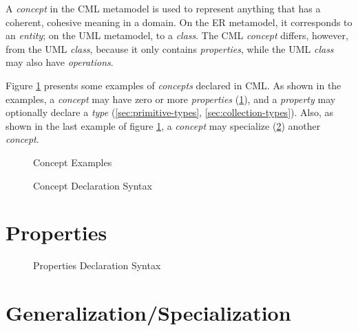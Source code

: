 A \emph{concept} in the CML metamodel is used to represent anything
that has a coherent, cohesive meaning in a domain.
On the ER \cite{er} metamodel,
it corresponds to an \emph{entity};
on the UML \cite{uml} metamodel,
to a \emph{class}.
The CML \emph{concept} differs, however, from the UML \emph{class},
because it only contains \emph{properties},
while the UML \emph{class} may also have \emph{operations}.

Figure \ref{fig:ex:concepts} presents some examples of \emph{concepts} declared in CML.
As shown in the examples,
a \emph{concept} may have zero or more \emph{properties}
(\ref{sec:properties}),
and a \emph{property} may optionally declare a \emph{type}
(\ref{sec:primitive-types}, \ref{sec:collection-types}).
Also, as shown in the last example of figure \ref{fig:ex:concepts},
a \emph{concept} may specialize
(\ref{sec:generalization})
another \emph{concept}.

\begin{figure}
\verbatimfont{\small}
\begin{framed}

\end{framed}
\caption{Concept Examples}
\label{fig:ex:concepts}
\end{figure}


\begin{figure}
\verbatimfont{\small}
\begin{framed}

\end{framed}
\caption{Concept Declaration Syntax}
\label{fig:concept-syntax}
\end{figure}

\section{Properties}\label{sec:properties}

\begin{figure}
\verbatimfont{\small}
\begin{framed}

\end{framed}
\caption{Properties Declaration Syntax}
\label{fig:properties-syntax}
\end{figure}

\section{Generalization/Specialization}\label{sec:generalization}
